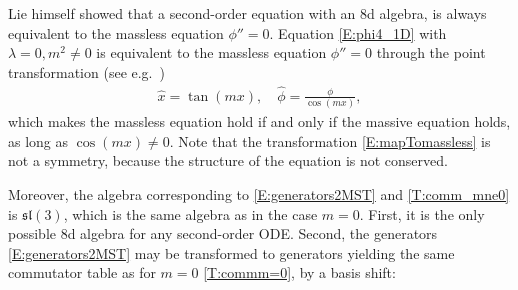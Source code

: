 \documentclass[a4paper,hidelinks, 12pt]{article}
\numberwithin{equation}{section}
\theoremstyle{plain}
\newcommand{\La}{\mathfrak}
\begin{document}
Lie himself showed that a second-order equation with an 8d algebra, is always equivalent to the massless equation $\phi''=0$.
Equation \eqref{E:phi4_1D} with $\lambda=0, m^2 \ne 0$ is equivalent to the massless equation
$\hat{\phi}''=0$ through the point transformation
(see e.g.~\cite{mahomed2007symmetry})
\begin{align}\label{E:mapTomassless}
	\hat{x}= \tan(mx), \quad\hat{\phi}= \frac{\phi}{\cos(mx)}, 
\end{align}
which makes the massless equation hold if and only if the massive equation
holds, as long as $\cos(mx)\ne 0$. Note that the transformation \eqref{E:mapTomassless} is not a symmetry, because the structure of the equation is not conserved.

Moreover, the algebra corresponding to \eqref{E:generators2MST} and \eqref{T:comm_mne0} is $\La{sl}(3)$, which is the same algebra as in the case $m=0$. First, it is the only possible 8d algebra for any second-order ODE. Second,
the generators \eqref{E:generators2MST} may be transformed to generators 
yielding the same commutator table as for $m=0$ \eqref{T:commm=0}, by a basis shift:
\end{document}
